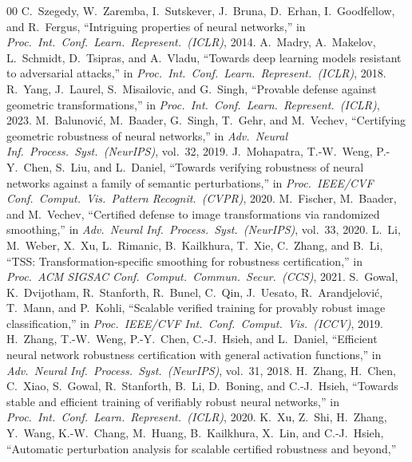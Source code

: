 \documentclass[conference]{IEEEtran}
\begin{document}
\begin{thebibliography}{00}
  C.~Szegedy, W.~Zaremba, I.~Sutskever, J.~Bruna, D.~Erhan,
  I.~Goodfellow, and R.~Fergus,
  ``Intriguing properties of neural networks,''
  in \textit{Proc.\ Int.\ Conf.\ Learn.\ Represent.\ (ICLR)}, 2014.
  A.~Madry, A.~Makelov, L.~Schmidt, D.~Tsipras, and A.~Vladu,
  ``Towards deep learning models resistant to adversarial attacks,''
  in \textit{Proc.\ Int.\ Conf.\ Learn.\ Represent.\ (ICLR)}, 2018.
  R.~Yang, J.~Laurel, S.~Misailovic, and G.~Singh,
  ``Provable defense against geometric transformations,''
  in \textit{Proc.\ Int.\ Conf.\ Learn.\ Represent.\ (ICLR)}, 2023.
  M.~Balunovi\'{c}, M.~Baader, G.~Singh, T.~Gehr, and M.~Vechev,
  ``Certifying geometric robustness of neural networks,''
  in \textit{Adv.\ Neural Inf.\ Process.\ Syst.\ (NeurIPS)}, vol.~32, 2019.
  J.~Mohapatra, T.-W.~Weng, P.-Y.~Chen, S.~Liu, and L.~Daniel,
  ``Towards verifying robustness of neural networks against a family of
    semantic perturbations,''
  in \textit{Proc.\ IEEE/CVF Conf.\ Comput.\ Vis.\ Pattern Recognit.\ (CVPR)},
  2020.
  M.~Fischer, M.~Baader, and M.~Vechev,
  ``Certified defense to image transformations via randomized smoothing,''
  in \textit{Adv.\ Neural Inf.\ Process.\ Syst.\ (NeurIPS)}, vol.~33, 2020.
  L.~Li, M.~Weber, X.~Xu, L.~Rimanic, B.~Kailkhura, T.~Xie, C.~Zhang,
  and B.~Li,
  ``TSS: Transformation-specific smoothing for robustness certification,''
  in \textit{Proc.\ ACM SIGSAC Conf.\ Comput.\ Commun.\ Secur.\ (CCS)}, 2021.
  S.~Gowal, K.~Dvijotham, R.~Stanforth, R.~Bunel, C.~Qin, J.~Uesato,
  R.~Arandjelovi\'{c}, T.~Mann, and P.~Kohli,
  ``Scalable verified training for provably robust image classification,''
  in \textit{Proc.\ IEEE/CVF Int.\ Conf.\ Comput.\ Vis.\ (ICCV)}, 2019.
  H.~Zhang, T.-W.~Weng, P.-Y.~Chen, C.-J.~Hsieh, and L.~Daniel,
  ``Efficient neural network robustness certification with general
    activation functions,''
  in \textit{Adv.\ Neural Inf.\ Process.\ Syst.\ (NeurIPS)}, vol.~31, 2018.
  H.~Zhang, H.~Chen, C.~Xiao, S.~Gowal, R.~Stanforth, B.~Li, D.~Boning,
  and C.-J.~Hsieh,
  ``Towards stable and efficient training of verifiably robust neural
    networks,''
  in \textit{Proc.\ Int.\ Conf.\ Learn.\ Represent.\ (ICLR)}, 2020.
  K.~Xu, Z.~Shi, H.~Zhang, Y.~Wang, K.-W.~Chang, M.~Huang, B.~Kailkhura,
  X.~Lin, and C.-J.~Hsieh,
  ``Automatic perturbation analysis for scalable certified robustness and
    beyond,''

\end{thebibliography}
\end{document}
